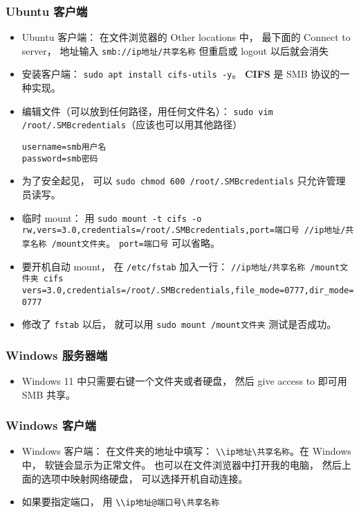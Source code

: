 \subsubsection{Ubuntu 客户端}
\begin{itemize}
\item Ubuntu 客户端： 在文件浏览器的 Other locations 中， 最下面的 Connect to server， 地址输入 \verb|smb://ip地址/共享名称| 但重启或 logout 以后就会消失
\item 安装客户端： \verb|sudo apt install cifs-utils -y|。 \textbf{CIFS} 是 SMB 协议的一种实现。
\item 编辑文件（可以放到任何路径，用任何文件名）： \verb|sudo vim /root/.SMBcredentials|（应该也可以用其他路径）
\begin{lstlisting}[language=none]
username=smb用户名
password=smb密码
\end{lstlisting}
\item 为了安全起见， 可以 \verb|sudo chmod 600 /root/.SMBcredentials| 只允许管理员读写。
\item 临时 mount： 用 \verb|sudo mount -t cifs -o rw,vers=3.0,credentials=/root/.SMBcredentials,port=端口号 //ip地址/共享名称 /mount文件夹|。 \verb|port=端口号| 可以省略。
\item 要开机自动 mount， 在 \verb|/etc/fstab| 加入一行： \verb|//ip地址/共享名称 /mount文件夹 cifs vers=3.0,credentials=/root/.SMBcredentials,file_mode=0777,dir_mode=0777|
\item 修改了 \verb|fstab| 以后， 就可以用 \verb|sudo mount /mount文件夹| 测试是否成功。
\end{itemize}

\subsubsection{Windows 服务器端}
\begin{itemize}
\item Windows 11 中只需要右键一个文件夹或者硬盘， 然后 give access to 即可用 SMB 共享。
\end{itemize}

\subsubsection{Windows 客户端}
\begin{itemize}
\item Windows 客户端： 在文件夹的地址中填写： \verb|\\ip地址\共享名称|。在 Windows 中， 软链会显示为正常文件。 也可以在文件浏览器中打开我的电脑， 然后上面的选项中映射网络硬盘， 可以选择开机自动连接。
\item 如果要指定端口， 用 \verb|\\ip地址@端口号\共享名称|
\end{itemize}

